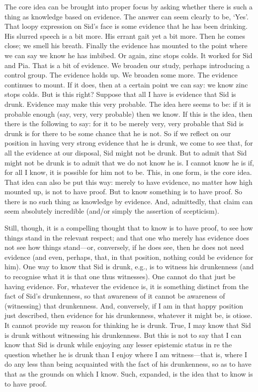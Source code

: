 The core idea can be brought into proper focus by asking whether there is such a thing as knowledge based on evidence. The answer can seem clearly to be, ‘Yes’. That loopy expression on Sid’s face is some evidence that he has been drinking. His slurred speech is a bit more. His errant gait yet a bit more. Then he comes close; we smell his breath. Finally the evidence has mounted to the point where we can say we know he has imbibed. Or again, zinc stops colds. It worked for Sid and Pia. That is a bit of evidence. We broaden our study, perhaps introducing a control group. The evidence holds up. We broaden some more. The evidence continues to mount. If it does, then at a certain point we can say: we know zinc stops colds. But is this right? Suppose that all I have is evidence that Sid is drunk. Evidence may make this very probable. The idea here seems to be: if it is probable enough (say, very, very probable) then we know. If this is the idea, then there is the following to say: for it to be merely very, very probable that Sid is drunk is for there to be some chance that he is not. So if we reflect on our position in having very strong evidence that he is drunk, we come to see that, for all the evidence at our disposal, Sid might not be drunk. But to admit that Sid might not be drunk is to admit that we do not know he is. I cannot know he is if, for all I know, it is possible for him not to be. This, in one form, is the core idea. That idea can also be put this way: merely to have evidence, no matter how high mounted up, is not to have proof. But to know something is to have proof. So there is no such thing as knowledge by evidence. And, admittedly, that claim can seem absolutely incredible (and/or simply the assertion of scepticism).

Still, though, it is a compelling thought that to know is to have proof, to see how things stand in the relevant respect; and that one who merely has evidence does not see how things stand---or, conversely, if he does see, then he does not need evidence (and even, perhaps, that, in that position, nothing could be evidence for him). One way to know that Sid is drunk, e.g., is to witness his drunkenness (and to recognise what it is that one thus witnesses). One cannot do that just be having evidence. For, whatever the evidence is, it is something distinct from the fact of Sid’s drunkenness, so that awareness of it cannot be awareness of (witnessing) that drunkenness. And, conversely, if I am in that happy position just described, then evidence for his drunkenness, whatever it might be, is otiose. It cannot provide my reason for thinking he is drunk. True, I may know that Sid is drunk without witnessing his drunkenness. But this is not to say that I can know that Sid is drunk while enjoying any lesser epistemic status in re the question whether he is drunk than I enjoy where I am witness—that is, where I do any less than being acquainted with the fact of his drunkenness, so as to have that as the grounds on which I know. Such, expanded, is the idea that to know is to have proof.

